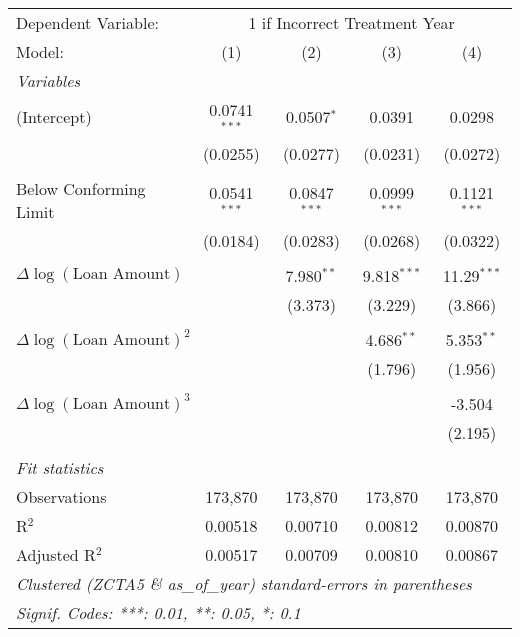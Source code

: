 \begin{tabular}{lcccc}
    \toprule
    Dependent Variable: & \multicolumn{4}{c}{1 if Incorrect Treatment Year}\\
    Model:                            & (1)            & (2)            & (3)            & (4)\\  
    \midrule
    \emph{Variables}\\
    (Intercept)                       & 0.0741$^{***}$ & 0.0507$^{*}$   & 0.0391         & 0.0298\\   
                                      & (0.0255)       & (0.0277)       & (0.0231)       & (0.0272)\\  
                                      \\ 
    Below Conforming Limit            & 0.0541$^{***}$ & 0.0847$^{***}$ & 0.0999$^{***}$ & 0.1121$^{***}$\\   
                                      & (0.0184)       & (0.0283)       & (0.0268)       & (0.0322)\\   
\\
    $\Delta \log(\textrm{Loan Amount})$    &                & 7.980$^{**}$   & 9.818$^{***}$  & 11.29$^{***}$\\   
                                      &                & (3.373)        & (3.229)        & (3.866)\\
                                      \\   
    $\Delta \log(\textrm{Loan Amount})^2$    &                &                & 4.686$^{**}$   & 5.353$^{**}$\\   
                                      &                &                & (1.796)        & (1.956)\\
                                      \\   
    $\Delta \log(\textrm{Loan Amount})^3$    &                &                &                & -3.504\\   
                                      &                &                &                & (2.195)\\   
                                      \\
    \midrule
    \emph{Fit statistics}\\
    Observations                      & 173,870        & 173,870        & 173,870        & 173,870\\  
    R$^2$                             & 0.00518        & 0.00710        & 0.00812        & 0.00870\\  
    Adjusted R$^2$                    & 0.00517        & 0.00709        & 0.00810        & 0.00867\\  
    \midrule \midrule
    \multicolumn{5}{l}{\emph{Clustered (ZCTA5 \& as\_of\_year) standard-errors in parentheses}}\\
    \multicolumn{5}{l}{\emph{Signif. Codes: ***: 0.01, **: 0.05, *: 0.1}}\\
 \end{tabular}